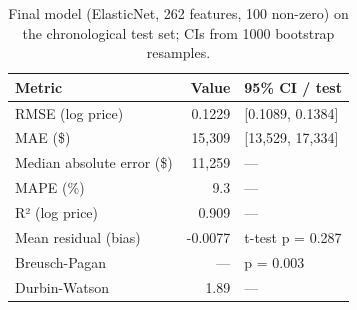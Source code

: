 \begin{table}[t]
\centering
\small
\begin{tabular}{lrl}
\toprule
Metric & Value & 95\% CI / test \\
\midrule
RMSE (log price) & 0.1229 & [0.1089, 0.1384] \\
MAE (\$) & 15,309 & [13,529, 17,334] \\
Median absolute error (\$) & 11,259 & — \\
MAPE (\%) & 9.3 & — \\
R² (log price) & 0.909 & — \\
Mean residual (bias) & -0.0077 & t-test p = 0.287 \\
Breusch-Pagan & — & p = 0.003 \\
Durbin-Watson & 1.89 & — \\
\bottomrule
\end{tabular}
\caption{Final model (ElasticNet, 262 features, 100 non-zero) on the chronological test set; CIs from 1000 bootstrap resamples.}
\label{tab:test_details}
\end{table}
